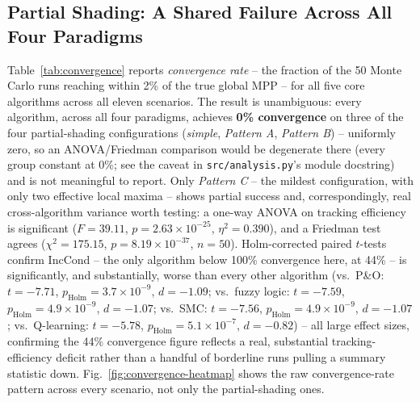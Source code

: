 \subsection{Partial Shading: A Shared Failure Across All Four Paradigms}
\label{sec:partial-shading-results}
Table~\ref{tab:convergence} reports \emph{convergence rate} -- the
fraction of the 50 Monte Carlo runs reaching within 2\% of the true global
MPP -- for all five core algorithms across all eleven scenarios. The
result is unambiguous: every algorithm, across all four paradigms,
achieves \textbf{0\% convergence} on three of the four partial-shading
configurations (\emph{simple}, \emph{Pattern A}, \emph{Pattern B}) --
uniformly zero, so an ANOVA/Friedman comparison would be degenerate there
(every group constant at 0\%; see the caveat in \texttt{src/analysis.py}'s
module docstring) and is not meaningful to report. Only \emph{Pattern C} --
the mildest configuration, with only two effective local maxima -- shows
partial success and, correspondingly, real cross-algorithm variance worth
testing: a one-way ANOVA on tracking efficiency is significant
($F=39.11$, $p=2.63\times10^{-25}$, $\eta^2=0.390$), and a Friedman test
agrees ($\chi^2=175.15$, $p=8.19\times10^{-37}$, $n=50$). Holm-corrected
paired $t$-tests confirm IncCond -- the only algorithm below 100\%
convergence here, at 44\% -- is significantly, and substantially, worse
than every other algorithm (vs.\ P\&O: $t=-7.71$,
$p_{\text{Holm}}=3.7\times10^{-9}$, $d=-1.09$; vs.\ fuzzy logic: $t=-7.59$,
$p_{\text{Holm}}=4.9\times10^{-9}$, $d=-1.07$; vs.\ SMC: $t=-7.56$,
$p_{\text{Holm}}=4.9\times10^{-9}$, $d=-1.07$; vs.\ Q-learning: $t=-5.78$,
$p_{\text{Holm}}=5.1\times10^{-7}$, $d=-0.82$) -- all large effect sizes,
confirming the 44\% convergence figure reflects a real, substantial
tracking-efficiency deficit rather than a handful of borderline runs
pulling a summary statistic down. Fig.~\ref{fig:convergence-heatmap} shows
the raw convergence-rate pattern across every scenario, not only the
partial-shading ones.


